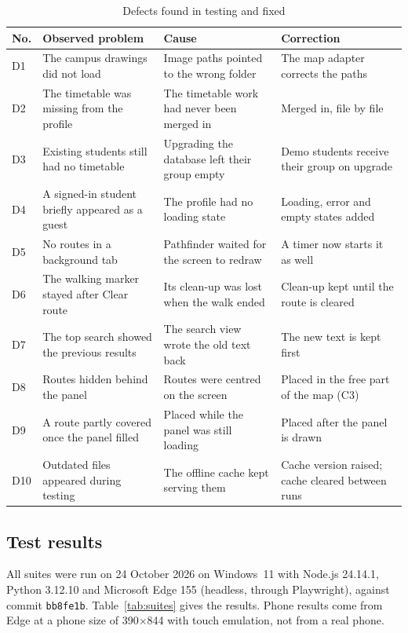 \documentclass[12pt,a4paper]{report}
\newcommand{\tablespacing}{\singlespacing\small}
\begin{document}
\begin{table}[htbp]
\centering\tablespacing
\caption{Defects found in testing and fixed}\label{tab:defects}
\begin{tabular}{p{0.7cm}p{4.4cm}p{4.2cm}p{4.4cm}}
\toprule
No. & Observed problem & Cause & Correction \\
\midrule
D1 & The campus drawings did not load & Image paths pointed to the wrong folder & The map adapter corrects the paths \\
D2 & The timetable was missing from the profile & The timetable work had never been merged in & Merged in, file by file \\
D3 & Existing students still had no timetable & Upgrading the database left their group empty & Demo students receive their group on upgrade \\
D4 & A signed-in student briefly appeared as a guest & The profile had no loading state & Loading, error and empty states added \\
D5 & No routes in a background tab & Pathfinder waited for the screen to redraw & A timer now starts it as well \\
D6 & The walking marker stayed after Clear route & Its clean-up was lost when the walk ended & Clean-up kept until the route is cleared \\
D7 & The top search showed the previous results & The search view wrote the old text back & The new text is kept first \\
D8 & Routes hidden behind the panel & Routes were centred on the screen & Placed in the free part of the map (C3) \\
D9 & A route partly covered once the panel filled & Placed while the panel was still loading & Placed after the panel is drawn \\
D10 & Outdated files appeared during testing & The offline cache kept serving them & Cache version raised; cache cleared between runs \\
\bottomrule
\end{tabular}
\end{table}

\subsection{Test results}
All suites were run on 24 October 2026 on Windows~11 with Node.js 24.14.1, Python 3.12.10 and Microsoft Edge 155 (headless, through Playwright), against commit \texttt{bb8fe1b}. Table~\ref{tab:suites} gives the results. Phone results come from Edge at a phone size of 390$\times$844 with touch emulation, not from a real phone.
\end{document}
